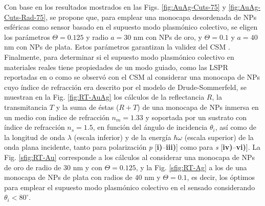 Con base en los resultados mostrados en las Figs. \ref{fig:AuAg-Cuts-75} y \ref{fig:AuAg-Cuts-Rad-75}, se propone que, para emplear una monocapa desordenada de NPs esféricas como sensor basado en el supuesto modo plasmónico colectivo, se eligen los parámetros $\Theta=0.125$ y radio $a=30$ nm con NPs de oro, y $\Theta=0.1$ y $a=40$ nm con NPs de plata. Estos parámetros garantizan la validez del CSM \cite{garcia2012multiple}. Finalmente, para determinar si el supuesto modo plasmónico colectivo en materiales reales tiene propiedades de un modo guiado, como las LSPR reportadas en \cite{kabashin2009plasmonic} o como se observó con el CSM al considerar una monocapa de NPs cuyo índice de refracción era descrito por el modelo de Drude-Sommerfeld, se  muestran en la Fig. \ref{fig:RT-AuAg}  los cálculos de la reflectancia $R$, la transmitancia $T$ y la suma de éstas ($R+T$) de una monocapa de NPs inmersa en un medio con índice de refracción $n_m=1.33$ y soportada por un sustrato con índice de refracción $n_s=1.5$, en función del ángulo de incidencia $\theta_i$, así como de la longitud de onda $\lambda$ (escala inferior) y de la energía  $\hbar\omega$ (escala superior) de la onda plana incidente, tanto para polarización \emph{p}  [\textbf{i)}--\textbf{iii)}] como para \emph{s} [\textbf{iv)}--\textbf{vi)}]. La Fig. \ref{sfig:RT-Au} corresponde a los cálculos al considerar una monocapa de NPs de oro de radio de $30$ nm y con $\Theta=0.125$, y la  Fig. \ref{sfig:RT-Ag} a los de una monocapa de NPs de plata con radios de $40$ nm y $\Theta=0.1$, es decir, los óptimos para emplear el supuesto modo plasmónico colectivo en el sensado considerando $\theta_i<80^\circ$.

